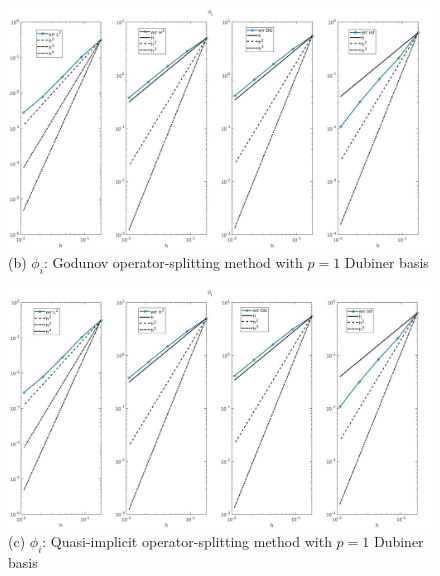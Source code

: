 \documentclass[a4paper,11pt]{article}
\begin{document}
\begin{figure}[h]
\begin{center}
\includegraphics[width =\textwidth]{./errors/D1_Phii_1_GO.jpg}
\caption*{(b) $\phi_i$: Godunov operator-splitting method with $p=1$ Dubiner basis}
\end{center}
\end{figure}
\begin{figure}[H]
\begin{center}
\includegraphics[width =\textwidth]{./errors/D1_Phii_1_OS.jpg}
\caption*{(c) $\phi_i$: Quasi-implicit operator-splitting method with $p=1$ Dubiner basis}
\end{center}
\end{figure}
\newpage
\end{document}
